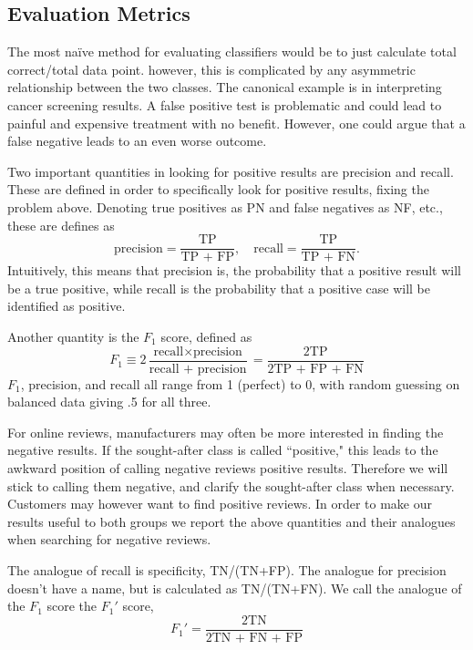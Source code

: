 \documentclass{article} %
\begin{document}
	\subsection{Evaluation Metrics}
	
	The most na\"ive method for evaluating classifiers would be to just calculate total correct/total data point. however, this is complicated by any asymmetric relationship between the two classes. The canonical example is in interpreting cancer screening results. A false positive test is problematic and could lead to painful and expensive treatment with no benefit. However, one could argue that a false negative leads to an even worse outcome. 
	
	Two important quantities in looking for positive results are precision and recall. These are defined in order to specifically look for positive results, fixing the problem above. Denoting true positives as PN and false negatives as NF, etc., these are defines as 
	\begin{equation}
	\mbox{precision} = \frac{\mbox {TP}}{\mbox {TP + FP}},\quad \mbox{recall} = \frac{\mbox {TP}}{\mbox {TP + FN}}.
	\end{equation}
	Intuitively, this means that precision is, the probability that a positive result will be a true positive, while recall is the probability that a positive case will be identified as positive.
	
	Another quantity is the $F_1$ score, defined as
	\begin{equation}
	F_1 \equiv 2\frac{\mbox{recall}\times\mbox{precision}}{\mbox{recall +
			precision}} = \frac{\mbox{2TP}}{\mbox{2TP + FP + FN}}
	\end{equation}
	$F_1$, precision, and recall all range from 1 (perfect) to 0, with random guessing on balanced data giving .5 for all three.
	
	For online reviews, manufacturers may often be more interested in finding the negative results. If the sought-after class is called ``positive," this leads to the awkward position of calling negative reviews positive results. Therefore we will stick to calling them negative, and clarify the sought-after class when necessary. Customers may however want to find positive reviews. In order to make our results useful to both groups we report the above quantities and their analogues when searching for negative reviews.
	
	The analogue of recall is specificity, TN/(TN+FP). The analogue for precision doesn't have a name, but is calculated as TN/(TN+FN). We call the analogue of the $F_1$ score the $F_1'$ score,
	\begin{equation}
	F_1' = \frac{\mbox{2TN}}{\mbox{2TN + FN + FP}}
	\end{equation}
	
\end{document}
